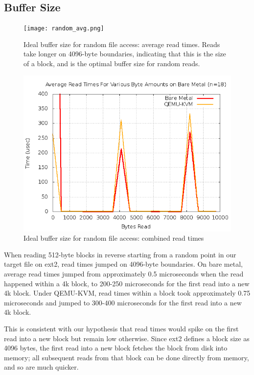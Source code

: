 \documentclass[letterpaper,twocolumn,10pt]{article}
\begin{document}
\subsection{Buffer Size}
\begin{figure}[!ht]
\texttt{[image: random\_avg.png]}
\caption{Ideal buffer size for random file access: average read times. Reads take longer on 4096-byte boundaries, indicating that this is the size of a block, and is the optimal buffer size for random reads.}
\end{figure}
\begin{figure}[!ht]
\includegraphics[scale=.35]{random_combined.png}
\caption{Ideal buffer size for random file access: combined read times}
\end{figure}

When reading 512-byte blocks in reverse starting from a random point in our target file on ext2, read times jumped on 4096-byte boundaries. On bare metal, average read times jumped from approximately 0.5 microseconds when the read happened within a 4k block, to 200-250 microseconds for the first read into a new 4k block. Under QEMU-KVM, read times within a block  took approximately 0.75 microseconds and jumped to 300-400 microseconds for the first read into a new 4k block.  

This is consistent with our hypothesis that read times would spike on the first read into a new block but remain low otherwise. Since ext2 defines a block size as 4096 bytes, the first read into a new block fetches the block from disk into memory; all subsequent reads from that block can be done directly from memory, and so are much quicker.
\end{document}
